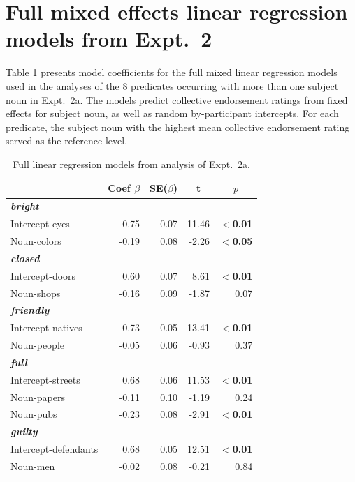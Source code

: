 \documentclass[preprint,12pt,authoryear,titlepage]{elsarticle}
\begin{document}
\section{Full mixed effects linear regression models from Expt.~2}\label{2-stats}

Table \ref{expt2aanalysis} presents model coefficients for the full mixed linear regression models used in the analyses of the 8 predicates occurring with more than one subject noun in Expt.~2a. The models predict collective endorsement ratings from fixed effects for subject noun, as well as random by-participant intercepts. For each predicate, the subject noun with the highest mean collective endorsement rating served as the reference level.

\begin{table}[htb] 
	\renewcommand\thetable{B.1}
	\centering \caption{Full linear regression models from analysis of Expt.~2a.} \label{expt2aanalysis}
	\begin{tabular}{lrrrr}\toprule
		&	Coef $\beta$	&	SE($\beta$)	&	\multicolumn{1}{c}{ \textbf{t}}	&	\multicolumn{1}{c}{$p$}\\ \midrule
		\emph{\textbf{bright}} \\
		Intercept-eyes	& 	0.75 &	0.07	&	11.46	&	\textbf{$<$0.01} \\
		Noun-colors	&	-0.19	&   0.08	&	-2.26	&	\textbf{$<$0.05} \\ \hline
		\emph{\textbf{closed}}\\
		Intercept-doors	& 	0.60	&	0.07	&	8.61	&	\textbf{$<$0.01} \\
		Noun-shops	&	-0.16	&   0.09	&	-1.87	&	0.07 \\ \hline
		\emph{\textbf{friendly}}\\
		Intercept-natives	& 	0.73	&	0.05	&	13.41	&	\textbf{$<$0.01} \\
		Noun-people	&	-0.05	&   0.06	&	-0.93	&	0.37 \\\hline
		\emph{\textbf{full}}\\
		Intercept-streets	& 	0.68	&	0.06	&	11.53	&	\textbf{$<$0.01} \\
		Noun-papers	&	-0.11	&   0.10	&	-1.19	&	0.24 \\
		Noun-pubs	&	-0.23	&   0.08	&	-2.91	&	\textbf{$<$0.01} \\\hline
		\emph{\textbf{guilty}}\\
		Intercept-defendants	& 	0.68	&	0.05	&	12.51	&	\textbf{$<$0.01} \\
		Noun-men	&	-0.02	&   0.08	&	-0.21	&	0.84 \\\hline

\end{tabular}
\end{table}
\end{document}
